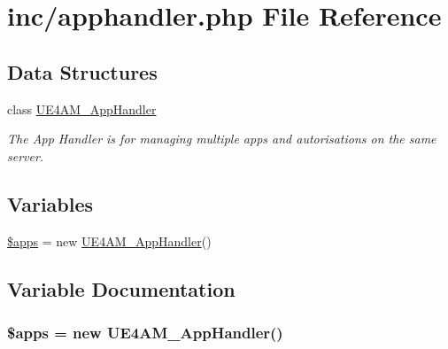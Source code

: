 \hypertarget{apphandler_8php}{\section{inc/apphandler.php File Reference}
\label{apphandler_8php}
}
\subsection*{Data Structures}
\begin{DoxyCompactItemize}
\item 
class \hyperlink{class_u_e4_a_m___app_handler}{U\-E4\-A\-M\-\_\-\-App\-Handler}
\begin{DoxyCompactList}\small\item\em The App Handler is for managing multiple apps and autorisations on the same server. \end{DoxyCompactList}\end{DoxyCompactItemize}
\subsection*{Variables}
\begin{DoxyCompactItemize}
\item 
\hyperlink{apphandler_8php_aa12d79990b45fd1c382ec749ade7fc0c}{\$apps} = new \hyperlink{class_u_e4_a_m___app_handler}{U\-E4\-A\-M\-\_\-\-App\-Handler}()
\end{DoxyCompactItemize}


\subsection{Variable Documentation}
\hypertarget{apphandler_8php_aa12d79990b45fd1c382ec749ade7fc0c}{
\subsubsection[{\$apps}]{\setlength{\rightskip}{0pt plus 5cm}\$apps = new {\bf U\-E4\-A\-M\-\_\-\-App\-Handler}()}}\label{apphandler_8php_aa12d79990b45fd1c382ec749ade7fc0c}
